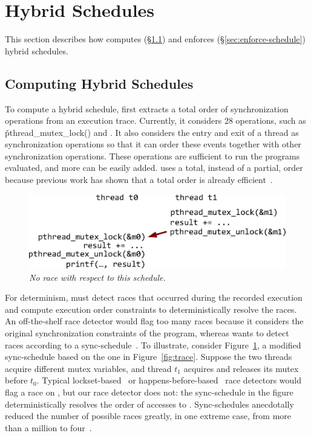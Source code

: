 \section{Hybrid Schedules} \label{sec:schedule}

This section describes how \peregrine computes (\S\ref{sec:compute-schedule})
and enforces (\S\ref{sec:enforce-schedule}) hybrid schedules.

\subsection{Computing Hybrid Schedules} \label{sec:compute-schedule}

To compute a hybrid schedule, \peregrine first extracts a total order of
synchronization operations from an execution trace.  Currently, it
considers 28  operations, such as \v{pthread\_mutex\_lock()}
and .  It also considers
the entry and exit of a thread as synchronization operations so that it can
order these events together with other synchronization operations.  These
operations are sufficient to run the programs evaluated, and more can be
easily added.  \peregrine uses a total, instead of a partial, order because
previous work has shown that a total order is already
efficient~\cite{cui:tern:osdi10,kendo:asplos09}.

\begin{figure}[t]
\centering
\includegraphics[width=.9\columnwidth]{peregrine/figures/concurrent-intervals.eps}
\caption{{\em No \peregrine race with respect to this
    schedule.}} \label{fig:concurrent-intervals}
\end{figure}

For determinism, \peregrine must detect races that occurred during the recorded
execution and compute execution order constraints to deterministically
resolve the races.  An off-the-shelf race detector would flag too many
races because it considers the original synchronization
constraints of the program, whereas \peregrine wants to detect races according
to a sync-schedule~\cite{pres:sosp09,recplay:tocs}.  To illustrate,
consider Figure~\ref{fig:concurrent-intervals}, a modified sync-schedule
based on the one in Figure~\ref{fig:trace}.  Suppose the two threads
acquire different mutex variables, and thread $t_1$ acquires and releases
its mutex before $t_0$.  Typical lockset-based~\cite{savage:eraser}
or happens-before-based~\cite{lamportclock} race detectors would flag a
race on , but our race detector does not: the sync-schedule
in the figure deterministically resolves the order of accesses to .  
Sync-schedules anecdotally reduced the number of
possible races greatly, in one extreme case, from more than a million to
four~\cite{pres:sosp09}.


